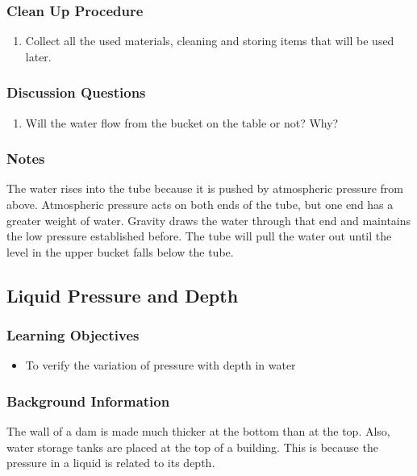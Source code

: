\subsubsection*{Clean Up Procedure}
\begin{enumerate}
\item{Collect all the used materials, cleaning and storing items that will be used later.} 
\end{enumerate}

\subsubsection*{Discussion Questions}
\begin{enumerate}
\item{Will the water flow from the bucket on the table or not? Why?}
\end{enumerate}

\subsubsection*{Notes}
The water rises into the tube because it is pushed by atmospheric pressure from above. Atmospheric pressure acts on both ends of the tube, but one end has a greater weight of water. Gravity draws the water through that end and maintains the low pressure established before. The tube will pull the water out until the level in the upper bucket falls below the tube. 

\subsection{Liquid Pressure and Depth}

\subsubsection*{Learning Objectives}
\begin{itemize}
\item{To verify the variation of pressure with depth in water} 
\end{itemize}

\subsubsection*{Background Information}
The wall of a dam is made much thicker at the bottom than at the top. Also, water storage tanks are placed at the top of a building. This is because the pressure in a liquid is related to its depth.

